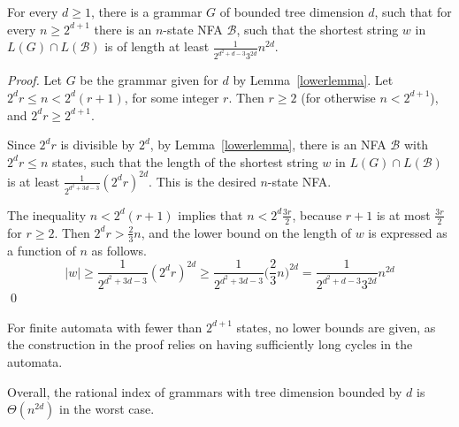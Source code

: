 \documentclass[runningheads]{llncs}
\begin{document}
\begin{theorem}\label{lower_bound_theorem}
For every $d \geqslant 1$,
there is a grammar $G$ of bounded tree dimension $d$,
such that for every $n \geqslant 2^{d+1}$
there is an $n$-state NFA $\mathcal{B}$,
such that the shortest string $w$ in $L(G) \cap L(\mathcal{B})$
is of length at least $\frac{1}{2^{d^2 + d - 3} 3^{2d}} n^{2d}$.
\end{theorem}
\begin{proof}
Let $G$ be the grammar given for $d$ by Lemma~\ref{lowerlemma}.
Let $2^d r \leqslant n < 2^d (r+1)$, for some integer $r$.
Then $r \geqslant 2$ (for otherwise $n < 2^{d+1}$),
and $2^d r \geqslant 2^{d+1}$.

Since $2^d r$ is divisible by $2^d$,
by Lemma~\ref{lowerlemma},
there is an NFA $\mathcal{B}$ with $2^d r \leqslant n$ states,
such that the length of the shortest string $w$ in $L(G) \cap L(\mathcal{B})$
is at least $\frac{1}{2^{d^2 + 3d - 3}} (2^d r)^{2d}$.
This is the desired $n$-state NFA.


The inequality $n < 2^d (r+1)$ implies that $n < 2^d \frac{3r}{2}$,
because $r+1$ is at most $\frac{3r}{2}$ for $r \geqslant 2$.
Then $2^d r > \frac{2}{3}n$,
and the lower bound on the length of $w$ is expressed as a function of $n$
as follows.
\begin{equation*}
	|w|
		\geqslant
	\frac{1}{2^{d^2 + 3d - 3}} (2^d r)^{2d}
		\geqslant
	\frac{1}{2^{d^2 + 3d - 3}} \big(\frac{2}{3} n\big)^{2d}
		=
	\frac{1}{2^{d^2 + d - 3} 3^{2d}} n^{2d}
\end{equation*}
\qed
\end{proof}

For finite automata with fewer than $2^{d+1}$ states,
no lower bounds are given,
as the construction in the proof relies on having sufficiently long cycles in the automata.

Overall,
the rational index of grammars with tree dimension bounded by $d$
is $\Theta(n^{2d})$ in the worst case.

\end{document}
